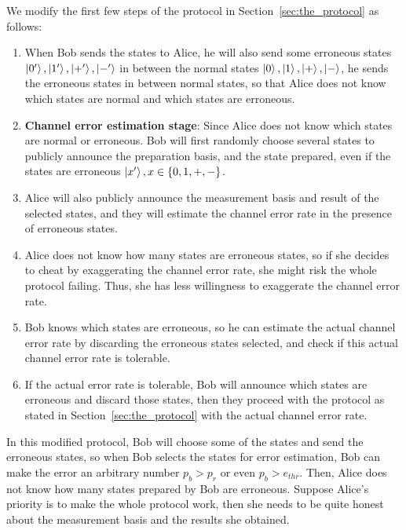 \documentclass[%
 reprint,
superscriptaddress,
 amsmath,amssymb,
 aps,
]{revtex4-2}
\begin{document}
We modify the first few steps of the protocol in Section~\ref{sec:the_protocol} as follows: 
\begin{enumerate}
    \item When Bob sends the states to Alice, he will also send some erroneous states $\ket{0'}, \ket{1'}, \ket{+'}, \ket{-'} $ in between the normal states $\ket{0}, \ket{1}, \ket{+}, \ket{-}$, he sends the erroneous states in between normal states, so that Alice does not know which states are normal and which states are erroneous.
    
    \item \textbf{Channel error estimation stage}: Since Alice does not know which states are normal or erroneous. Bob will first randomly choose several states to publicly announce the preparation basis, and the state prepared, even if the states are erroneous $\ket{x'}, x\in\{0, 1, +, -\}$.

    \item Alice will also publicly announce the measurement basis and result of the selected states, and they will estimate the channel error rate in the presence of erroneous states.

    \item Alice does not know how many states are erroneous states, so if she decides to cheat by exaggerating the channel error rate, she might risk the whole protocol failing. Thus, she has less willingness to exaggerate the channel error rate.

    \item Bob knows which states are erroneous, so he can estimate the actual channel error rate by discarding the erroneous states selected, and check if this actual channel error rate is tolerable.

    \item If the actual error rate is tolerable, Bob will announce which states are erroneous and discard those states, then they proceed with the protocol as stated in Section~\ref{sec:the_protocol} with the actual channel error rate.
\end{enumerate}

In this modified protocol, Bob will choose some of the states and send the erroneous states, so when Bob selects the states for error estimation, Bob can make the error an arbitrary number $p_b>p_r$ or even $p_b>e_{thr}$. Then, Alice does not know how many states prepared by Bob are erroneous. Suppose Alice's priority is to make the whole protocol work, then she needs to be quite honest about the measurement basis and the results she obtained. 
\end{document}
